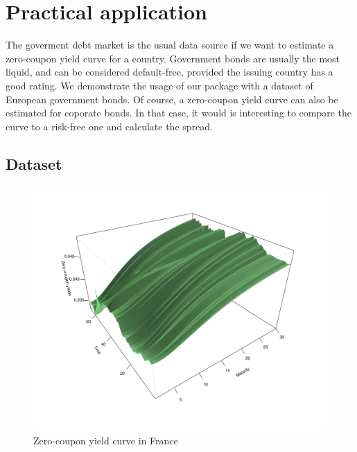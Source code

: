 \newpage
\section{Practical application}
\label{sec:pract-appl}

The goverment debt market is the usual data source if we want to estimate a zero-coupon yield curve for a country. Government bonds are usually the most liquid, and can be considered default-free, provided the issuing country has a good rating. We demonstrate the usage of our package with a dataset of European government bonds. Of course, a zero-coupon yield curve can also be estimated for coporate bonds. In that case, it would is interesting to compare the curve to a risk-free one and calculate the spread.

\subsection{Dataset}

\begin{figure}[htb]
  \begin{center}
  \caption{Zero-coupon yield curve in France}
\includegraphics{3dplot}
\end{center}
\end{figure}

